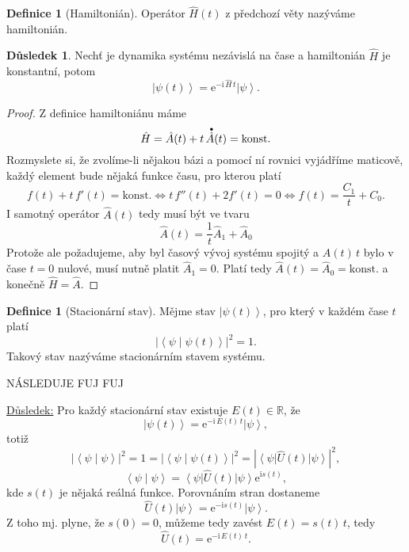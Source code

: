 \documentclass[10pt,a4paper]{article}
\theoremstyle{definition}
\newtheorem{definition}[theorem]{Definice}
\newtheorem{corollary}[theorem]{Důsledek}
\newcommand{\const}[1]{\mathrm{#1}}
\newcommand{\abs}[1]{\left| #1 \right|}
\newcommand{\bra}[1]{\left< #1 \right|}
\newcommand{\ket}[1]{\left| #1 \right>}
\newcommand{\braket}[2]{\left< #1 \middle| #2 \right>}
\newcommand{\e}[1]{\const{e}^{#1}}
\renewcommand{\i}{\const{i}}
\def\R{\mathbb{R}}
\newcommand{\bigdot}[1]{\accentset{\bullet}{#1}}
\def\konst{\mathrm{konst.}}
\begin{document}
\begin{definition}[Hamiltonián]
    Operátor $\hat H(t)$ z předchozí věty nazýváme hamiltonián.
\end{definition}

\begin{corollary}
    Nechť je dynamika systému nezávislá na čase a hamiltonián $\hat H$ je konstantní, potom
    \begin{equation*}
        \ket{\psi(t)} = \e{-\i \, \hat{H} \, t} \ket{\psi}.
    \end{equation*}
\end{corollary}
\begin{proof}
    Z definice hamiltoniánu máme
    \begin{equation*}
        \hat H = \hat A(t) + t \, \bigdot{\hat A}(t) = \konst
    \end{equation*}
    Rozmyslete si, že zvolíme-li nějakou bázi a pomocí ní rovnici vyjádříme maticově, každý element bude nějaká funkce času, pro kterou platí
    \begin{equation*}
        f(t) + t \, f'(t) = \konst
        \iff
        t \, f''(t) + 2 f'(t) = 0
        \iff
        f(t) = \frac{C_1}{t} + C_0.
    \end{equation*}
    I samotný operátor $\hat A(t)$ tedy musí být ve tvaru
    \begin{equation*}
        \hat A(t) = \frac{1}{t} \hat A_1 + \hat A_0
    \end{equation*}
    Protože ale požadujeme, aby byl časový vývoj systému spojitý a $\hat A(t) \, t$ bylo v čase $t=0$ nulové, musí nutně platit $\hat A_1 = 0$. Platí tedy $\hat A(t) = \hat A_0 = \konst$ a konečně $\hat H = \hat A$.
\end{proof}

\begin{definition}[Stacionární stav]
    Mějme stav $\ket{\psi(t)}$, pro který v každém čase $t$ platí
    \begin{equation*}
        \abs{\braket{\psi}{\psi(t)}}^2 = 1.
    \end{equation*}
    Takový stav nazýváme stacionárním stavem systému.
\end{definition}

\pagebreak
NÁSLEDUJE FUJ FUJ

\vspace{2em}
\underline{Důsledek:}
Pro každý stacionární stav existuje $E(t) \in \R$, že $$\ket{\psi(t)} = \e{-\i \, E(t) \, t} \ket{\psi},$$ totiž $$\abs{\braket{\psi}{\psi}}^2 = 1 = \abs{\braket{\psi}{\psi(t)}}^2 = \abs{\bra{\psi} \hat{U}(t) \ket{\psi}}^2,$$ $$\braket{\psi}{\psi} = \bra{\psi} \hat{U}(t) \ket{\psi} \e{\i s(t)},$$
kde $s(t)$ je nějaká reálná funkce. Porovnáním stran dostaneme $$\hat{U}(t) \ket{\psi} = \e{-\i s(t)} \ket{\psi}.$$ Z toho mj. plyne, že $s(0)=0$, můžeme tedy zavést $E(t) = s(t) \, t$, tedy $$\hat{U}(t) = \e{-\i \, E(t) \, t}.$$
\end{document}
